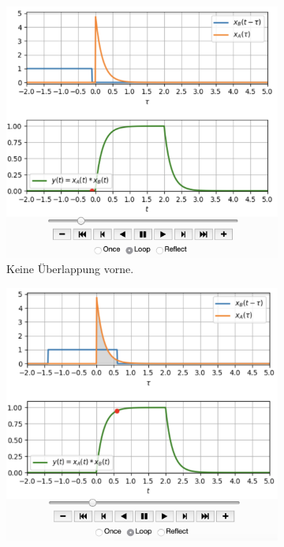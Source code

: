 \documentclass[11pt,a4paper,DIV=12]{scrartcl}
\numberwithin{equation}{section}
\numberwithin{figure}{section}
\begin{document}
\begin{figure}[h!]
\centering
\begin{subfigure}{0.45\textwidth}
\centering
\includegraphics[width=\textwidth]{../convolution_ct/conv_var2_1_C964DD7400.png}
\caption{Keine Überlappung vorne.}
\label{fig:C964DD7400_v2_1}
\end{subfigure}
\begin{subfigure}{0.45\textwidth}
\centering
\includegraphics[width=\textwidth]{../convolution_ct/conv_var2_2_C964DD7400.png}

\end{subfigure}
\end{figure}
\end{document}
